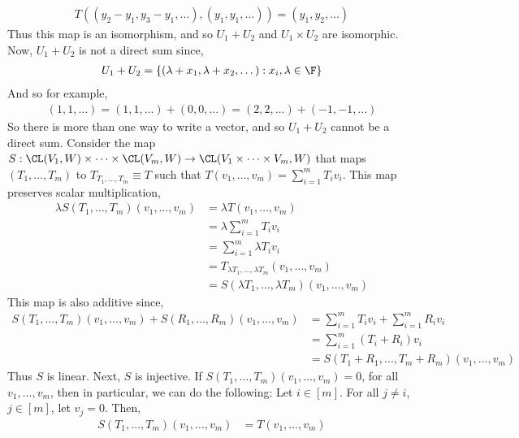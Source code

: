 \documentclass{book}
\begin{document}
\begin{enumerate}[label=\arabic*)]
      \begin{align*}
        T\left( (y_2 - y_1, y_3 - y_1, \dots), (y_1, y_1, \dots) \right) = (y_1, y_2, \dots)
      \end{align*}
      Thus this map is an isomorphism, and so $U_1 + U_2$ and $U_1 \times U_2$ are isomorphic. Now, $U_1 + U_2$ is not a direct sum since,
      \begin{align*}
        U_1 + U_2 = \{(\lambda + x_1, \lambda + x_2, \dots): x_i, \lambda \in \F\}
      \end{align*}
      And so for example,
      \begin{align*}
        (1, 1, \dots) = (1, 1, \dots) + (0, 0, \dots) = (2, 2, \dots) + (-1, -1, \dots)
      \end{align*}
      So there is more than one way to write a vector, and so $U_1 + U_2$ cannot be a direct sum.
    \ii
      Consider the map $S: \CL(V_1, W) \times \dots \times \CL(V_m, W) \to \CL(V_1 \times\dots\times V_m, W)$ that maps $(T_1, \dots, T_m)$ to $T_{T_1, \dots, T_m} \equiv T$ such that
      $T(v_1, \dots, v_m) = \sum_{i = 1}^{m}T_iv_i$. This map preserves scalar multiplication,
      \begin{align*}
        \lambda S(T_1, \dots, T_m)(v_1, \dots, v_m) & = \lambda T(v_1, \dots, v_m) \\
        & = \lambda\sum_{i = 1}^{m}T_iv_i \\
        & = \sum_{i = 1}^{m}\lambda T_iv_i \\
        & = T_{\lambda T_1, \dots, \lambda T_m}(v_1, \dots, v_m) \\
        & = S(\lambda T_1, \dots, \lambda T_m)(v_1, \dots, v_m)
      \end{align*}
      This map is also additive since,
      \begin{align*}
        S(T_1, \dots, T_m)(v_1, \dots, v_m) + S(R_1, \dots, R_m)(v_1, \dots, v_m) & = \sum_{i = 1}^{m}T_iv_i + \sum_{i = 1}^{m}R_iv_i \\ 
        & = \sum_{i = 1}^{m}(T_i + R_i)v_i \\
        & = S(T_1 + R_1, \dots, T_m + R_m)(v_1, \dots, v_m)
      \end{align*}
      Thus $S$ is linear. Next, $S$ is injective. If $S(T_1, \dots, T_m)(v_1, \dots, v_m) = 0$, for all $v_1, \dots, v_m$, then in particular, we can do the following: Let $i \in [m]$. For
      all $j \neq i$, $j \in [m]$, let $v_j = 0$. Then,
      \begin{align*}
        S(T_1, \dots, T_m)(v_1, \dots, v_m) & = T(v_1, \dots, v_m) \\

\end{align*}
\end{enumerate}
\end{document}

